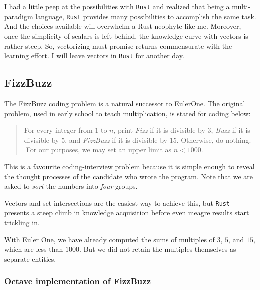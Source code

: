 \documentclass[
  a4paper,
]{article}
\begin{document}
I had a little peep at the possibilities with \texttt{Rust} and realized
that being a
\href{https://en.wikipedia.org/wiki/Comparison_of_multi-paradigm_programming_languages}{multi-paradigm
language}, \texttt{Rust} provides many possibilities to accomplish the
same task. And the choices available will overwhelm a Rust-neophyte like
me. Moreover, once the simplicity of scalars is left behind, the
knowledge curve with vectors is rather steep. So, vectorizing must
promise returns commensurate with the learning effort. I will leave
vectors in \texttt{Rust} for another day.

\hypertarget{fizzbuzz}{%
\subsection{FizzBuzz}\label{fizzbuzz}}

The \href{https://leetcode.com/problems/fizz-buzz/}{FizzBuzz coding
problem} is a natural successor to EulerOne. The original problem, used
in early school to teach multiplication, is stated for coding below:

\begin{quote}
For every integer from \(1\) to \(n\), print \emph{Fizz} if it is
divisible by \(3\), \emph{Buzz} if it is divisible by \(5\), and
\emph{FizzBuzz} if it is divisible by \(15\). Otherwise, do nothing.
{[}For our purposes, we may set an upper limit as \(n < 1000\).{]}
\end{quote}

This is a favourite coding-interview problem because it is simple enough
to reveal the thought processes of the candidate who wrote the program.
Note that we are asked to \emph{sort} the numbers into \emph{four}
groups.

Vectors and set intersections are the easiest way to achieve this, but
\texttt{Rust} presents a steep climb in knowledge acquisition before
even meagre results start trickling in.

With Euler One, we have already computed the sums of multiples of \(3\),
\(5\), and \(15\), which are less than \(1000\). But we did not retain
the multiples themselves as separate entities.

\hypertarget{octave-implementation-of-fizzbuzz}{%
\subsubsection{Octave implementation of
FizzBuzz}\label{octave-implementation-of-fizzbuzz}}
\end{document}
